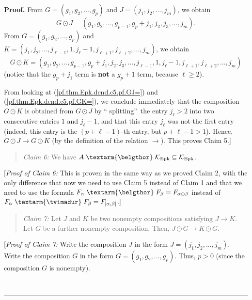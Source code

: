 \documentclass[numbers=enddot,12pt,final,onecolumn,notitlepage]{scrartcl}%
\theoremstyle{definition}
\newenvironment{statement}{\begin{quote}}{\end{quote}}
\newenvironment{proof}[1][Proof]{\noindent\textbf{#1.} }{\ \rule{0.5em}{0.5em}}
\newcommand{\tvi}{\left. \textarm{\tvimadur} \right.}
\newcommand{\bel}{\left. \textarm{\belgthor} \right.}
\begin{document}
\begin{proof}
From $G=\left(  g_{1},g_{2},\ldots,g_{p}\right)  $ and $J=\left(  j_{1}%
,j_{2},\ldots,j_{m}\right)  $, we obtain%
\begin{equation}
G\odot J=\left(  g_{1},g_{2},\ldots,g_{p-1},g_{p}+j_{1},j_{2},j_{3}%
,\ldots,j_{m}\right)  . \label{pf.thm.Epk.dend.c5.pf.GJ=}%
\end{equation}
From $G=\left(  g_{1},g_{2},\ldots,g_{p}\right)  $ and $K=\left(  j_{1}%
,j_{2},\ldots,j_{\ell-1},1,j_{\ell}-1,j_{\ell+1},j_{\ell+2},\ldots
,j_{m}\right)  $, we obtain%
\begin{equation}
G\odot K=\left(  g_{1},g_{2},\ldots,g_{p-1},g_{p}+j_{1},j_{2},j_{3}%
,\ldots,j_{\ell-1},1,j_{\ell}-1,j_{\ell+1},j_{\ell+2},\ldots,j_{m}\right)
\label{pf.thm.Epk.dend.c5.pf.GK=}%
\end{equation}
(notice that the $g_{p}+j_{1}$ term is \textbf{not} a $g_{p}+1$ term, because
$\ell\geq2$).

From looking at (\ref{pf.thm.Epk.dend.c5.pf.GJ=}) and
(\ref{pf.thm.Epk.dend.c5.pf.GK=}), we conclude immediately that the
composition $G\odot K$ is obtained from $G\odot J$ by \textquotedblleft
splitting\textquotedblright\ the entry $j_{\ell}>2$ into two consecutive
entries $1$ and $j_{\ell}-1$, and that this entry $j_{\ell}$ was not the first
entry (indeed, this entry is the $\left(  p+\ell-1\right)  $-th entry, but
$p+\ell-1>1$). Hence, $G\odot J\rightarrow G\odot K$ (by the definition of the
relation $\rightarrow$). This proves Claim 5.]

\begin{statement}
\textit{Claim 6:} We have $A\bel\mathcal{K}_{\operatorname*{Epk}}%
\subseteq\mathcal{K}_{\operatorname*{Epk}}$.
\end{statement}

[\textit{Proof of Claim 6:} This is proven in the same way as we proved Claim
2, with the only difference that now we need to use Claim 5 instead of Claim 1
and that we need to use the formula $F_{\alpha}\bel  F_{\beta}=F_{\alpha
\odot\beta}$ instead of $F_{\alpha}\tvi  F_{\beta}=F_{\left[  \alpha
,\beta\right]  }$.]

\begin{statement}
\textit{Claim 7:} Let $J$ and $K$ be two nonempty compositions satisfying
$J\rightarrow K$. Let $G$ be a further nonempty composition. Then, $J\odot
G\rightarrow K\odot G$.
\end{statement}

[\textit{Proof of Claim 7:} Write the composition $J$ in the form $J=\left(
j_{1},j_{2},\ldots,j_{m}\right)  $. Write the composition $G$ in the form
$G=\left(  g_{1},g_{2},\ldots,g_{p}\right)  $. Thus, $p>0$ (since the
composition $G$ is nonempty).


\end{proof}
\end{document}

